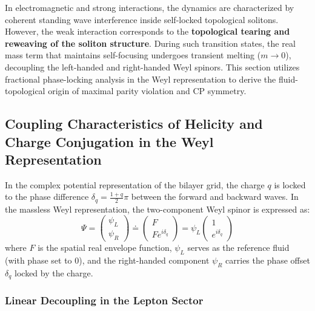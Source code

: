 \documentclass[12pt, a4paper]{article}
\begin{document}
In electromagnetic and strong interactions, the dynamics are characterized by coherent standing wave interference inside self-locked topological solitons. However, the weak interaction corresponds to the \textbf{topological tearing and reweaving of the soliton structure}. During such transition states, the real mass term that maintains self-focusing undergoes transient melting ($m \to 0$), decoupling the left-handed and right-handed Weyl spinors. This section utilizes fractional phase-locking analysis in the Weyl representation to derive the fluid-topological origin of maximal parity violation and CP symmetry.

\subsection{Coupling Characteristics of Helicity and Charge Conjugation in the Weyl Representation}

In the complex potential representation of the bilayer grid, the charge $q$ is locked to the phase difference $\delta_q = \frac{1+q}{2}\pi$ between the forward and backward waves. In the massless Weyl representation, the two-component Weyl spinor is expressed as:
\begin{equation}
\Psi = \begin{pmatrix} \psi_L \\ \psi_R \end{pmatrix} \doteq \begin{pmatrix} F \\ F e^{i\delta_q} \end{pmatrix} = \psi_L \begin{pmatrix} 1 \\ e^{i\delta_q} \end{pmatrix} \label{eq:weyl_spinor}
\end{equation}
where $F$ is the spatial real envelope function, $\psi_L$ serves as the reference fluid (with phase set to $0$), and the right-handed component $\psi_R$ carries the phase offset $\delta_q$ locked by the charge.

\subsubsection{Linear Decoupling in the Lepton Sector}
\end{document}
